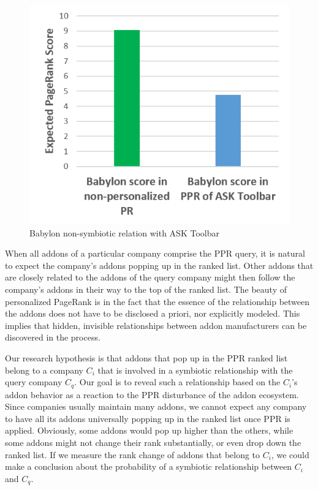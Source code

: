 \documentclass[11pt,oneside]{book}
\begin{document}
\begin{figure}[!htbp]
\centering
\includegraphics[width=\linewidth]{figures/babylon_nosym_ask.png}
\caption{Babylon non-symbiotic relation with ASK Toolbar}
\label{fig:babylon_nosym_ask}
\end{figure}
\fi

When all addons of a particular company comprise the PPR query, it is natural to expect the company's addons popping up in the ranked list. Other addons that are closely related to the addons of the query company might then follow the company's addons in their way to the top of the ranked list. The beauty of personalized PageRank is in the fact that the essence of the relationship between the addons does not have to be disclosed a priori, nor explicitly modeled. This implies that hidden, invisible relationships between addon manufacturers can be discovered in the process.

Our research hypothesis is that addons that pop up in the PPR ranked list belong to a company $C_i$ that is involved in a symbiotic relationship with the query company $C_q$. Our goal is to reveal such a relationship based on the $C_i$'s addon behavior as a reaction to the PPR disturbance of the addon ecosystem. Since companies usually maintain many addons, we cannot expect any company to have all its addons universally popping up in the ranked list once PPR is applied. Obviously, some addons would pop up higher than the others, while some addons might not change their rank substantially, or even drop down the ranked list. If we measure the rank change of addons that belong to $C_i$, we could make a conclusion about the probability of a symbiotic relationship between $C_i$ and $C_q$.
\end{document}
